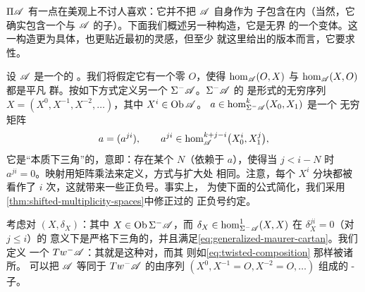 \begin{remark}\label{thm:unbounded-twisted-alternative}
\trSplitClosure $\Pi\mathscr{A}$ 有一点在美观上不讨人喜欢：它并不把 $\mathscr{A}$ 自身作为%
\trFull{}子\trCategory{}包含在内（当然，它确实包含一个与 $\mathscr{A}$ %
\trQuasiisomorphic{}的子\trCategory）。下面我们概述另一种构造，它是无界%
\trTwistedComplex{}的一个变体。这一构造更为具体，也更贴近最初的灵感，但至少
就这里给出的版本而言，它要求\trStrictlyUnital{}性。
\end{remark}

设 $\mathscr{A}$ 是一个\trStrictlyUnital{}的 \trACategory。我们将假定它有一个零%
\trObject{} $O$，使得 $\hom_{\mathscr{A}}(O,X)$ 与 $\hom_{\mathscr{A}}(X,O)$ 都是平凡
群。按如下方式定义另一个 \trACategory{} $\Sigma^-\mathscr{A}$。$\Sigma^-\mathscr{A}$ 的%
\trObject{}是形式的无穷序列 $X=(X^0,X^{-1},X^{-2},\ldots)$，其中
$X^i\in\operatorname{Ob}\mathscr{A}$。\trMorphism{} $a\in\hom^k_{\Sigma^-\mathscr{A}}(X_0,X_1)$ 是一个
无穷矩阵
\begin{equation*}
a=(a^{ji}),\qquad a^{ji}\in\hom^{k+j-i}_{\mathscr{A}}\bigl(X_0^i,X_1^j\bigr),
\end{equation*}
它是“本质下三角”的，意即：存在某个 $N$（依赖于 $a$），使得当 $j<i-N$ 时
$a^{ji}=0$。\trComposition{}映射用矩阵乘法来定义，方式与\trAdditive{}扩大处
相同。注意，每个 $X^i$ 分块都被看作\trSuspension{}了 $i$ 次，这就带来一些正负号。事实上，
为使下面的公式简化，我们采用\cref{thm:shifted-multiplicity-spaces}中修正过的
正负号约定。

考虑对 $(X,\delta_X)$：其中 $X\in\operatorname{Ob}\Sigma^-\mathscr{A}$，而
$\delta_X\in\hom^1_{\Sigma^-\mathscr{A}}(X,X)$ 在 $\delta_X^{ji}=0$（对 $j\le i$）的
意义下是严格下三角的，并且满足\eqref{eq:generalized-maurer-cartan}。我们定义
一个 \trACategory{} $Tw^-\mathscr{A}$：其\trObject{}就是这种对，而其\trMorphism{}%
则如\eqref{eq:twisted-composition} 那样被诸\trDifferential{}所\trDeformation。
可以把 $\mathscr{A}$ 等同于 $Tw^-\mathscr{A}$ 的由序列
$(X^0,X^{-1}=O,X^{-2}=O,\ldots)$ 组成的\trFull{} \trAinfty-子\trCategory。

